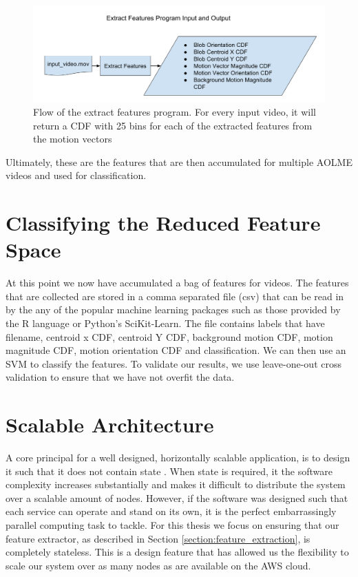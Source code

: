 \begin{figure}[h]
  \label{fig:extract_flow}
  \centering
  \includegraphics[width=14cm]{figures/extract_features_flow}
  \caption{Flow of the extract features program. For every input video, it will
  return a CDF with 25 bins for each of the extracted features from the motion
  vectors}
\end{figure}

Ultimately, these are the features that are then accumulated for multiple AOLME
videos and used for classification.

\section{\label{section:classification}Classifying the Reduced Feature Space}
At this point we now have accumulated a bag of features for videos. The features
that are collected are stored in a comma separated file (csv) that can be read
in by the any of the popular machine learning packages such as those provided
by the R language or Python's SciKit-Learn. The file contains labels that have
filename, centroid x CDF, centroid Y CDF, background motion CDF, motion magnitude
CDF, motion orientation CDF and classification. We can then use an SVM to classify
the features. To validate our results, we use leave-one-out cross validation
to ensure that we have not overfit the data.

\section{\label{section:distributed_processing}Scalable Architecture}
A core principal for a well designed, horizontally scalable application, is
to design it such that it does not contain state \cite{awsbestpractices}.
When state is required, it the software complexity increases substantially and
makes it difficult to distribute the system over a scalable amount of nodes.
However, if the software was designed such that each service can operate and
stand on its own, it is the perfect embarrassingly parallel computing task to
tackle. For this thesis we focus on ensuring that our feature extractor,
as described in Section \ref{section:feature_extraction}, is completely stateless.
This is a design feature that has allowed us the flexibility to scale our
system over as many nodes as are available on the AWS cloud.

